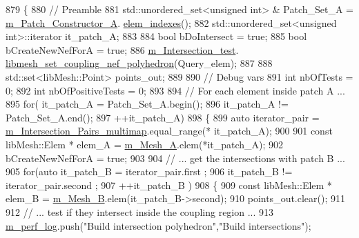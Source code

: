 \begin{DoxyCode}
879     \{
880         \textcolor{comment}{// Preamble}
881         std::unordered\_set<unsigned int> & Patch\_Set\_A = \hyperlink{classcarl_1_1_intersection___search_a3bc66e4e9a0b41d9b20093d4f6ca7611}{m\_Patch\_Constructor\_A}.
      \hyperlink{classcarl_1_1_patch__construction_ad92eca042b223e8be1cb3984a3dc8cba}{elem\_indexes}();
882         std::unordered\_set<unsigned int>::iterator it\_patch\_A;
883 
884         \textcolor{keywordtype}{bool} bDoIntersect = \textcolor{keyword}{true};
885         \textcolor{keywordtype}{bool} bCreateNewNefForA = \textcolor{keyword}{true};
886         \hyperlink{classcarl_1_1_intersection___search_afeedb5ff9144638151b7f956cf113fc4}{m\_Intersection\_test}.
      \hyperlink{classcarl_1_1_intersection___tools_acf2d17e703441bc9e3ed05d98f51ba85}{libmesh\_set\_coupling\_nef\_polyhedron}(Query\_elem);
887 
888         std::set<libMesh::Point> points\_out;
889 
890         \textcolor{comment}{// Debug vars}
891         \textcolor{keywordtype}{int} nbOfTests = 0;
892         \textcolor{keywordtype}{int} nbOfPositiveTests = 0;
893 
894         \textcolor{comment}{// For each element inside patch A ...}
895         \textcolor{keywordflow}{for}(    it\_patch\_A =  Patch\_Set\_A.begin();
896                 it\_patch\_A != Patch\_Set\_A.end();
897                 ++it\_patch\_A)
898         \{
899             \textcolor{keyword}{auto} iterator\_pair = \hyperlink{classcarl_1_1_intersection___search_a21bb47bfa3021d18b718919ad4a245d7}{m\_Intersection\_Pairs\_multimap}.equal\_range(*
      it\_patch\_A);
900 
901             \textcolor{keyword}{const} libMesh::Elem * elem\_A = \hyperlink{classcarl_1_1_intersection___search_a903b7b3a369ed2c1e80d6a20ba41d350}{m\_Mesh\_A}.elem(*it\_patch\_A);
902             bCreateNewNefForA = \textcolor{keyword}{true};
903 
904             \textcolor{comment}{// ... get the intersections with patch B ...}
905             \textcolor{keywordflow}{for}(\textcolor{keyword}{auto} it\_patch\_B = iterator\_pair.first ;
906                      it\_patch\_B != iterator\_pair.second ;
907                      ++it\_patch\_B )
908             \{
909                 \textcolor{keyword}{const} libMesh::Elem * elem\_B = \hyperlink{classcarl_1_1_intersection___search_a178cd617f59285fb858fddd78dec79d6}{m\_Mesh\_B}.elem(it\_patch\_B->second);
910                 points\_out.clear();
911 
912                 \textcolor{comment}{// ... test if they intersect inside the coupling region ...}
913                 \hyperlink{classcarl_1_1_intersection___search_aebe6210287a36909206b1a59f9cd17e0}{m\_perf\_log}.push(\textcolor{stringliteral}{"Build intersection polyhedron"},\textcolor{stringliteral}{"Build intersections"});

\end{DoxyCode}
